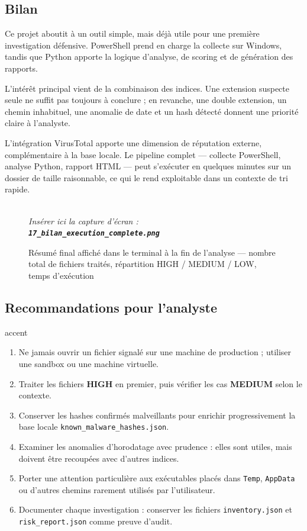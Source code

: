 \documentclass[12pt,a4paper]{article}
\newcommand{\screenshot}[2]{%
  \begin{figure}[H]
    \centering
    \begin{tcolorbox}[
      colback=screenshotbg,
      colframe=screenshotborder,
      fonttitle=\bfseries\small\color{white},
      coltitle=white,
      title={\faCamera\quad Capture d'écran — \texttt{#1}},
      left=6pt, right=6pt, top=6pt, bottom=6pt,
      width=\textwidth,
      arc=4pt
    ]
    \centering
    \vspace{0.4cm}
    \textcolor{gray}{\faImage}\\[4pt]
    {\small\color{gray}\itshape Insérer ici la capture d'écran :\\[2pt]
    \textbf{\texttt{#1}}}
    \vspace{0.4cm}
    \end{tcolorbox}
    \caption{#2}
  \end{figure}%
}
\begin{document}
\subsection{Bilan}

Ce projet aboutit à un outil simple, mais déjà utile pour une première investigation défensive. PowerShell prend en charge la collecte sur Windows, tandis que Python apporte la logique d'analyse, de scoring et de génération des rapports.

L'intérêt principal vient de la combinaison des indices. Une extension suspecte seule ne suffit pas toujours à conclure ; en revanche, une double extension, un chemin inhabituel, une anomalie de date et un hash détecté donnent une priorité claire à l'analyste.

L'intégration VirusTotal apporte une dimension de réputation externe, complémentaire à la base locale. Le pipeline complet — collecte PowerShell, analyse Python, rapport HTML — peut s'exécuter en quelques minutes sur un dossier de taille raisonnable, ce qui le rend exploitable dans un contexte de tri rapide.

\screenshot{17\_bilan\_execution\_complete.png}{Résumé final affiché dans le terminal à la fin de l'analyse — nombre total de fichiers traités, répartition HIGH / MEDIUM / LOW, temps d'exécution}

\subsection{Recommandations pour l'analyste}

\begin{riskbox}{accent}
  \color{white}
  \begin{enumerate}[itemsep=6pt]
    \item Ne jamais ouvrir un fichier signalé sur une machine de production ; utiliser une sandbox ou une machine virtuelle.
    \item Traiter les fichiers \textbf{HIGH} en premier, puis vérifier les cas \textbf{MEDIUM} selon le contexte.
    \item Conserver les hashes confirmés malveillants pour enrichir progressivement la base locale \texttt{known\_malware\_hashes.json}.
    \item Examiner les anomalies d'horodatage avec prudence : elles sont utiles, mais doivent être recoupées avec d'autres indices.
    \item Porter une attention particulière aux exécutables placés dans \texttt{Temp}, \texttt{AppData} ou d'autres chemins rarement utilisés par l'utilisateur.
    \item Documenter chaque investigation : conserver les fichiers \texttt{inventory.json} et \texttt{risk\_report.json} comme preuve d'audit.
  \end{enumerate}
\end{riskbox}
\end{document}
